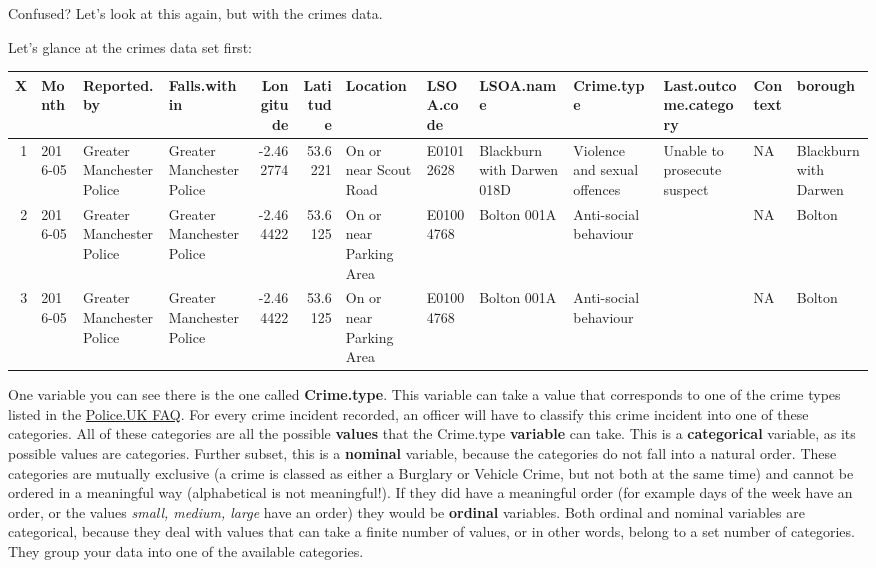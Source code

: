 \documentclass[]{book}
\theoremstyle{definition}
\theoremstyle{definition}
\theoremstyle{definition}
\theoremstyle{remark}
\begin{document}
Confused? Let's look at this again, but with the crimes data.

Let's glance at the crimes data set first:

\begin{tabular}{r|l|l|l|r|r|l|l|l|l|l|l|l}
\hline
X & Month & Reported.by & Falls.within & Longitude & Latitude & Location & LSOA.code & LSOA.name & Crime.type & Last.outcome.category & Context & borough\\
\hline
1 & 2016-05 & Greater Manchester Police & Greater Manchester Police & -2.462774 & 53.6221 & On or near Scout Road & E01012628 & Blackburn with Darwen 018D & Violence and sexual offences & Unable to prosecute suspect & NA & Blackburn with Darwen\\
\hline
2 & 2016-05 & Greater Manchester Police & Greater Manchester Police & -2.464422 & 53.6125 & On or near Parking Area & E01004768 & Bolton 001A & Anti-social behaviour &  & NA & Bolton\\
\hline
3 & 2016-05 & Greater Manchester Police & Greater Manchester Police & -2.464422 & 53.6125 & On or near Parking Area & E01004768 & Bolton 001A & Anti-social behaviour &  & NA & Bolton\\
\hline
\end{tabular}

One variable you can see there is the one called \textbf{Crime.type}.
This variable can take a value that corresponds to one of the crime
types listed in the
\href{https://www.police.uk/about-this-site/faqs/\#what-do-the-crime-categories-mean}{Police.UK
FAQ}. For every crime incident recorded, an officer will have to
classify this crime incident into one of these categories. All of these
categories are all the possible \textbf{values} that the Crime.type
\textbf{variable} can take. This is a \textbf{categorical} variable, as
its possible values are categories. Further subset, this is a
\textbf{nominal} variable, because the categories do not fall into a
natural order. These categories are mutually exclusive (a crime is
classed as either a Burglary or Vehicle Crime, but not both at the same
time) and cannot be ordered in a meaningful way (alphabetical is not
meaningful!). If they did have a meaningful order (for example days of
the week have an order, or the values \emph{small, medium, large} have
an order) they would be \textbf{ordinal} variables. Both ordinal and
nominal variables are categorical, because they deal with values that
can take a finite number of values, or in other words, belong to a set
number of categories. They group your data into one of the available
categories.
\end{document}
